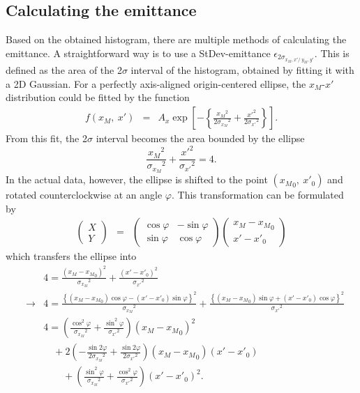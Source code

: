 \documentclass{article}
\begin{document}
\subsection{Calculating the emittance}
Based on the obtained histogram, there are multiple methods of calculating the emittance. A straightforward way is to use a StDev-emittance $\epsilon_{2\sigma_{x_M,x'/\ y_M,y'}}$. This is defined as the area of the 2$\sigma$ interval of the histogram, obtained by fitting it with a 2D Gaussian. For a perfectly axis-aligned origin-centered ellipse, the $x_M$-$x'$ distribution could be fitted by the function
\begin{eqnarray*}
f(x_M,\ x') & = & A_x \exp{\left[ -\left\{ \frac{{x_M}^2}{2{\sigma_{x_M}}^2} + \frac{{x'}^2}{2{\sigma_{x'}}^2} \right\}\right]}.
\end{eqnarray*}
From this fit, the 2$\sigma$ interval becomes the area bounded by the ellipse 
\begin{equation*}
\frac{{x_M}^2}{{\sigma_{x_M}}^2} + \frac{{x'}^2}{{\sigma_{x'}}^2} = 4.
\end{equation*}
In the actual data, however, the ellipse is shifted to the point $\left({x_M}_0,\ {x'}_0\right)$ and rotated counterclockwise at an angle $\varphi$. This transformation can be formulated by
\begin{eqnarray*}
\left(
\begin{array}{c}
	X \\
	Y
\end{array} \right) & = & \left(
\begin{array}{cc}
	\cos{\varphi} & -\sin{\varphi} \\
	\sin{\varphi} & \cos{\varphi}
\end{array} \right) \left(
\begin{array}{c}
	x_M - {x_M}_0 \\
	x' - {x'}_0
\end{array} \right)
\end{eqnarray*}
which transfers the ellipse into
\begin{eqnarray*}
& & 4 = \frac{\left(x_M-{x_M}_0\right)^2}{{\sigma_{x_M}}^2} + \frac{\left(x'-{x'}_0\right)^2}{{\sigma_{x'}}^2} \\
& \rightarrow & 4 = \frac{\left\{ \left(x_M-{x_M}_0\right)\cos{\varphi} - \left(x'-{x'}_0\right)\sin{\varphi} \right\}^2}{{\sigma_{x_M}}^2} + \frac{\left\{ \left(x_M-{x_M}_0\right)\sin{\varphi} + \left(x'-{x'}_0\right)\cos{\varphi} \right\}^2}{{\sigma_{x'}}^2} \\
& & 4 = \left( \frac{\cos^2{\varphi}}{{\sigma_{x_M}}^2} + \frac{\sin^2{\varphi}}{{\sigma_{x'}}^2} \right) \left( x_M-{x_M}_0 \right)^2 \\
& & \, \, \, \, \, \, + 2 \left( -\frac{\sin{2\varphi}}{2{\sigma_{x_M}}^2} + \frac{\sin{2\varphi}}{2{\sigma_{x'}}^2} \right) \left( x_M-{x_M}_0 \right) \left( x'-{x'}_0 \right) \\
& & \, \, \, \, \, \, \, \, \, \, \, \, + \left( \frac{\sin^2{\varphi}}{{\sigma_{x_M}}^2} + \frac{\cos^2{\varphi}}{{\sigma_{x'}}^2} \right) \left( x'-{x'}_0 \right)^2 .
\end{eqnarray*}
\end{document}
